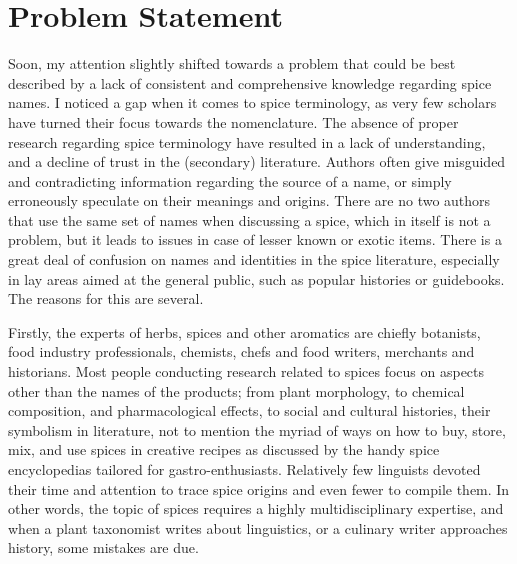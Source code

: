 \section{Problem Statement}

Soon, my attention slightly shifted towards a problem that could be best described by a lack of consistent and comprehensive knowledge regarding spice names. I noticed a gap when it comes to spice terminology, as very few scholars have turned their focus towards the nomenclature. The absence of proper research regarding spice terminology have resulted in a lack of understanding, and a decline of trust in the (secondary) literature. Authors often give misguided and contradicting information regarding the source of a name, or simply erroneously speculate on their meanings and origins. There are no two authors that use the same set of names when discussing a spice, which in itself is not a problem, but it leads to issues in case of lesser known or exotic items. There is a great deal of confusion on names and identities in the spice literature, especially in lay areas aimed at the general public, such as popular histories or guidebooks. The reasons for this are several.

Firstly, the experts of herbs, spices and other aromatics are chiefly botanists, food industry professionals, chemists, chefs and food writers, merchants and historians. Most people conducting research related to spices focus on aspects other than the names of the products; from plant morphology, to chemical composition, and pharmacological effects, to social and cultural histories, their symbolism in literature, not to mention the myriad of ways on how to buy, store, mix, and use spices in creative recipes as discussed by the handy spice encyclopedias tailored for gastro-enthusiasts. Relatively few linguists devoted their time and attention to trace spice origins and even fewer to compile them. In other words, the topic of spices requires a highly multidisciplinary expertise, and when a plant taxonomist writes about linguistics, or a culinary writer approaches history, some mistakes are due.

